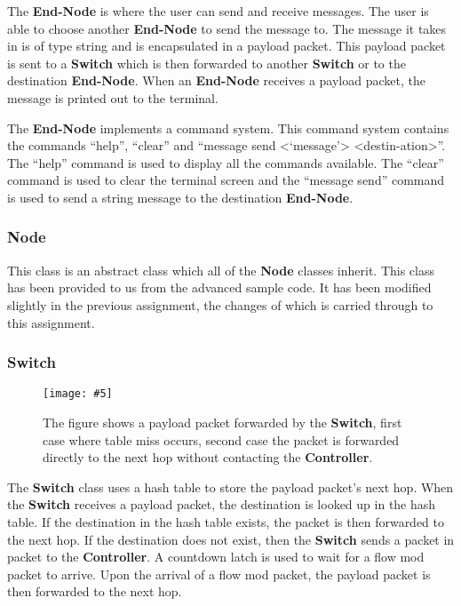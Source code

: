 \documentclass{article}
\newcommand{\includescalefigure}[5]{
  \begin{figure}[H]
    \centering
    \texttt{[image: \#5]}
    \captionsetup{width=.8\linewidth}
    \caption[#2]{#3}
    \label{#1}
  \end{figure}
}
\begin{document}
The \textbf{End-Node} is where the user can send and receive messages. The user
is able to choose another \textbf{End-Node} to send the message to. The message
it takes in is of type string and is encapsulated in a payload packet. This
payload packet is sent to a \textbf{Switch} which is then forwarded to another
\textbf{Switch} or to the destination \textbf{End-Node}. When an \textbf{End-Node}
receives a payload packet, the message is printed out to the terminal.

The \textbf{End-Node} implements a command system. This command system contains
the commands ``help'', ``clear'' and ``message send
\textless`message'\textgreater
\textless{}destin-\newline{}ation\textgreater{}''. The ``help'' command is used
to display all the commands available. The ``clear'' command is used to clear the
terminal screen and the ``message send'' command is used to send a string
message to the destination \textbf{End-Node}.

\subsubsection{Node}
This class is an abstract class which all of the \textbf{Node} classes inherit.
This class has been provided to us from the advanced sample code. It has been
modified slightly in the previous assignment, the changes of which is carried
through to this assignment.

\subsubsection{Switch}

\includescalefigure{RouterForward}{Router forwarding messages}{The figure shows
a payload packet forwarded by the \textbf{Switch}, first case where table miss
occurs, second case the packet is forwarded directly to the next hop without
contacting the \textbf{Controller}.}{1}{RouterForward.png}

The \textbf{Switch} class uses a hash table to store the payload packet's next
hop. When the \textbf{Switch} receives a payload packet, the destination is
looked up in the hash table. If the destination in the hash table exists, the
packet is then forwarded to the next hop. If the destination does not exist,
then the \textbf{Switch} sends a packet in packet to the \textbf{Controller}.
A countdown latch is used to wait for a flow mod packet to arrive. Upon the
arrival of a flow mod packet, the payload packet is then forwarded to the
next hop.
\end{document}
